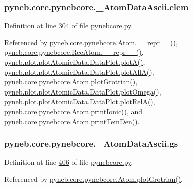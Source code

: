 \subsubsection[{elem}]{\setlength{\rightskip}{0pt plus 5cm}pyneb.\+core.\+pynebcore.\+\_\+\+Atom\+Data\+Ascii.\+elem}\label{classpyneb_1_1core_1_1pynebcore_1_1___atom_data_ascii_a330140eda27048983020488e50c5858a}


Definition at line \hyperlink{pynebcore_8py_source_l00304}{304} of file \hyperlink{pynebcore_8py_source}{pynebcore.\+py}.



Referenced by \hyperlink{pynebcore_8py_source_l02544}{pyneb.\+core.\+pynebcore.\+Atom.\+\_\+\+\_\+repr\+\_\+\+\_\+()}, \hyperlink{pynebcore_8py_source_l03032}{pyneb.\+core.\+pynebcore.\+Rec\+Atom.\+\_\+\+\_\+repr\+\_\+\+\_\+()}, \hyperlink{plot_atomic_data_8py_source_l00116}{pyneb.\+plot.\+plot\+Atomic\+Data.\+Data\+Plot.\+plot\+A()}, \hyperlink{plot_atomic_data_8py_source_l00188}{pyneb.\+plot.\+plot\+Atomic\+Data.\+Data\+Plot.\+plot\+All\+A()}, \hyperlink{pynebcore_8py_source_l02372}{pyneb.\+core.\+pynebcore.\+Atom.\+plot\+Grotrian()}, \hyperlink{plot_atomic_data_8py_source_l00372}{pyneb.\+plot.\+plot\+Atomic\+Data.\+Data\+Plot.\+plot\+Omega()}, \hyperlink{plot_atomic_data_8py_source_l00261}{pyneb.\+plot.\+plot\+Atomic\+Data.\+Data\+Plot.\+plot\+Rel\+A()}, \hyperlink{pynebcore_8py_source_l02167}{pyneb.\+core.\+pynebcore.\+Atom.\+print\+Ionic()}, and \hyperlink{pynebcore_8py_source_l02253}{pyneb.\+core.\+pynebcore.\+Atom.\+print\+Tem\+Den()}.

\hypertarget{classpyneb_1_1core_1_1pynebcore_1_1___atom_data_ascii_aed6d711337dfb385d65306e7f3c4d06d}{}
\subsubsection[{gs}]{\setlength{\rightskip}{0pt plus 5cm}pyneb.\+core.\+pynebcore.\+\_\+\+Atom\+Data\+Ascii.\+gs}\label{classpyneb_1_1core_1_1pynebcore_1_1___atom_data_ascii_aed6d711337dfb385d65306e7f3c4d06d}


Definition at line \hyperlink{pynebcore_8py_source_l00406}{406} of file \hyperlink{pynebcore_8py_source}{pynebcore.\+py}.



Referenced by \hyperlink{pynebcore_8py_source_l02372}{pyneb.\+core.\+pynebcore.\+Atom.\+plot\+Grotrian()}.

